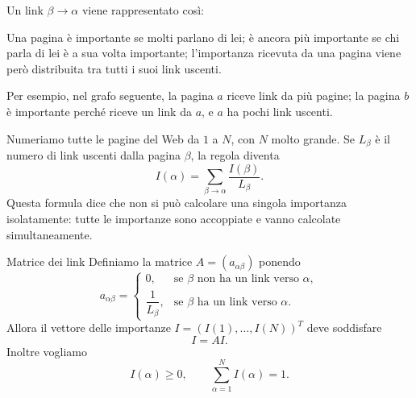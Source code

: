 \documentclass[a4paper]{article}
\begin{document}
Un link \(\beta\to\alpha\) viene rappresentato così:

\begin{center}
\end{center}

Una pagina è importante se molti parlano di lei; è ancora più importante se chi parla di lei è a sua volta importante; l'importanza ricevuta da una pagina viene però distribuita tra tutti i suoi link uscenti.

Per esempio, nel grafo seguente, la pagina \(a\) riceve link da più pagine; la pagina \(b\) è importante perché riceve un link da \(a\), e \(a\) ha pochi link uscenti.

\begin{center}
\end{center}

Numeriamo tutte le pagine del Web da \(1\) a \(N\), con \(N\) molto grande. Se \(L_\beta\) è il numero di link uscenti dalla pagina \(\beta\), la regola diventa
\[
    I(\alpha)
    =
    \sum_{\beta\to\alpha}\frac{I(\beta)}{L_\beta}.
\]
Questa formula dice che non si può calcolare una singola importanza isolatamente: tutte le importanze sono accoppiate e vanno calcolate simultaneamente.

\begin{snippetdefinition}{Matrice dei link}
    Definiamo la matrice \(A=(a_{\alpha\beta})\) ponendo
    \[
        a_{\alpha\beta}
        =
        \begin{cases}
            0, & \text{se } \beta \text{ non ha un link verso } \alpha,\\
            \dfrac1{L_\beta}, & \text{se } \beta \text{ ha un link verso } \alpha.
        \end{cases}
    \]
    Allora il vettore delle importanze \(I=(I(1),\ldots,I(N))^T\) deve soddisfare
    \[
        I=AI.
    \]
    Inoltre vogliamo
    \[
        I(\alpha)\geq 0,
        \qquad
        \sum_{\alpha=1}^N I(\alpha)=1.
    \]
\end{snippetdefinition}
\end{document}
